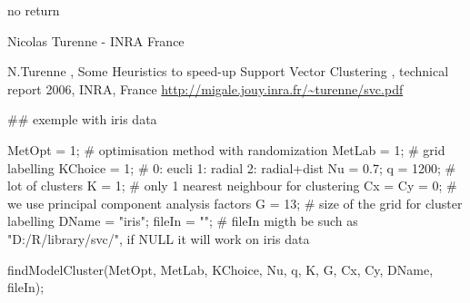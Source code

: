 \documentclass{article}
\begin{document}
\begin{Value}
no return
\end{Value}
\begin{Author}\relax
Nicolas Turenne - INRA France 
\end{Author}
\begin{References}\relax
N.Turenne , Some Heuristics to speed-up Support Vector Clustering , technical report 2006, INRA, France 
\url{http://migale.jouy.inra.fr/~turenne/svc.pdf}
\end{References}
\begin{Examples}
\begin{ExampleCode}

## exemple with iris data

MetOpt  = 1;    # optimisation method with randomization
MetLab  = 1;    # grid labelling
KChoice = 1;    # 0: eucli 1: radial 2: radial+dist 
Nu      = 0.7; 
q       = 1200;   # lot of clusters
K       = 1;    # only 1  nearest neighbour for clustering
Cx = Cy = 0; # we use principal component analysis factors
G       = 13; # size of the grid for cluster labelling
DName   = "iris";
fileIn  = ""; # fileIn migth be such as "D:/R/library/svc/", if NULL it will work on iris data

findModelCluster(MetOpt, MetLab, KChoice, Nu, q, K, G, Cx, Cy, DName, fileIn); 

\end{ExampleCode}
\end{Examples}
\end{document}
